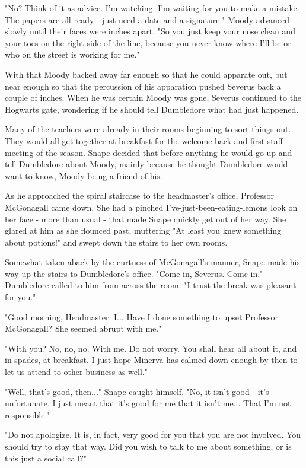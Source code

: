\documentclass[a4paper,11pt]{article}
\begin{document}
"No? Think of it as advice. I'm watching. I'm waiting for you to make a mistake. The papers are all ready - just need a date and a signature." Moody advanced slowly until their faces were inches apart. "So you just keep your nose clean and your toes on the right side of the line, because you never know where I'll be or who on the street is working for me."

With that Moody backed away far enough so that he could apparate out, but near enough so that the percussion of his apparation pushed Severus back a couple of inches. When he was certain Moody was gone, Severus continued to the Hogwarts gate, wondering if he should tell Dumbledore what had just happened.

Many of the teachers were already in their rooms beginning to sort things out. They would all get together at breakfast for the welcome back and first staff meeting of the season. Snape decided that before anything he would go up and tell Dumbledore about Moody, mainly because he thought Dumbledore would want to know, Moody being a friend of his.

As he approached the spiral staircase to the headmaster's office, Professor McGonagall came down. She had a pinched I've-just-been-eating-lemons look on her face - more than usual - that made Snape quickly get out of her way. She glared at him as she flounced past, muttering "At least you knew something about potions!" and swept down the stairs to her own rooms.

Somewhat taken aback by the curtness of McGonagall's manner, Snape made his way up the stairs to Dumbledore's office. "Come in, Severus. Come in." Dumbledore called to him from across the room. "I trust the break was pleasant for you."

"Good morning, Headmaster. I... Have I done something to upset Professor McGonagall? She seemed abrupt with me."

"With you? No, no, no. With me. Do not worry. You shall hear all about it, and in spades, at breakfast. I just hope Minerva has calmed down enough by then to let us attend to other business as well."

"Well, that's good, then..." Snape caught himself. "No, it isn't good - it's unfortunate. I just meant that it's good for me that it isn't me... That I'm not responsible."

"Do not apologize. It is, in fact, very good for you that you are not involved. You should try to stay that way. Did you wish to talk to me about something, or is this just a social call?"
\end{document}
